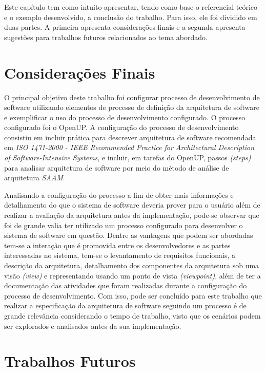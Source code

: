 Este capítulo tem como intuito apresentar, tendo como base o referencial teórico e o exemplo desenvolvido, a conclusão do trabalho. Para isso, ele foi dividido em duas partes. A primeira apresenta considerações finais e a segunda apresenta sugestões para trabalhos futuros relacionados ao tema abordado.

\section{Considerações Finais}

O principal objetivo deste trabalho foi configurar processo de desenvolvimento de software utilizando elementos de processo de definição da arquitetura de software e exemplificar o uso do processo de desenvolvimento configurado. O processo configurado foi o OpenUP.  A configuração do processo de desenvolvimento consistiu em incluir prática para descrever arquitetura de software recomendada em \emph{ISO 1471-2000 - IEEE Recommended Practice for Architectural Description of Software-Intensive Systems}, e incluir, em tarefas do OpenUP, passos \emph{(steps)} para analisar arquitetura de software por meio do método de análise de arquitetura \emph{\acrfull{SAAM}}.

Analisando a configuração do processo a fim de obter mais informações e detalhamento do que o sistema de software deveria prover para o usuário além de realizar a avaliação da arquitetura antes da implementação, pode-se observar que foi de grande valia ter utilizado um processo configurado para desenvolver o sistema de software em questão. Dentre as vantagens que podem ser abordadas tem-se a interação que é promovida entre os desenvolvedores e as partes interessadas no sistema, tem-se o levantamento de requisitos funcionais, a descrição da arquitetura, detalhamento dos componentes da arquitetura sob uma visão \emph{(view)} e representando usando um ponto de vista \emph{(viewpoint)}, além de ter a documentação das atividades que foram realizadas durante a configuração do processo de desenvolvimento. Com isso, pode ser concluído para este trabalho que realizar a especificação da arquitetura de software seguindo um processo é de grande relevância considerando o tempo de trabalho, visto que os cenários podem ser explorados e analisados antes da sua implementação.

\section{Trabalhos Futuros}

